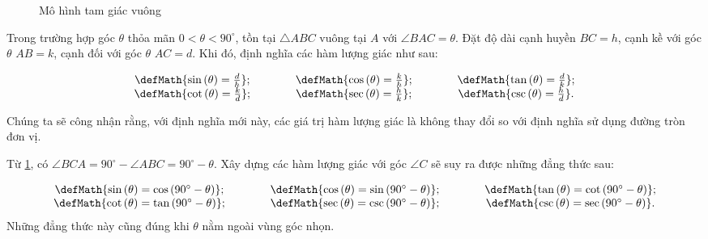 {\begin{minipageindent}{0.38\textwidth}
\begin{figure}[H]
         \caption{Mô hình tam giác vuông}
         \label{fig:toan_hoc_nen_tang:ham_luong_giac:tam_giac_vuong}
      \end{figure}
   \end{minipageindent}
   \hfill
   \begin{minipageindent}{0.58\textwidth}
      Trong trường hợp góc $\theta$ thỏa mãn $0 < \theta < 90^\circ$, tồn tại $\triangle ABC$ vuông tại $A$ với $\angle BAC = \theta$. Đặt độ dài cạnh huyền $BC = h$, cạnh kề với góc $\theta$ $AB = k$, cạnh đối với góc $\theta$ $AC = d$. Khi đó, định nghĩa các hàm lượng giác như sau:

      $$
         \begin{array}{ccccc}
            \defMath{\sin \left(\theta\right) = \frac{d}{h}}; &\qquad& \defMath{\cos \left(\theta\right) = \frac{k}{h}}; &\qquad& \defMath{\tan \left(\theta\right) = \frac{d}{k}}; \\
            \defMath{\cot \left(\theta\right) = \frac{k}{d}}; &\qquad& \defMath{\sec \left(\theta\right) = \frac{h}{k}}; &\qquad& \defMath{\csc \left(\theta\right) = \frac{h}{d}}.
         \end{array}
      $$

      Chúng ta sẽ công nhận rằng, với định nghĩa mới này, các giá trị hàm lượng giác là không thay đổi so với định nghĩa sử dụng đường tròn đơn vị.
   \end{minipageindent}
}

Từ \ref{fig:toan_hoc_nen_tang:ham_luong_giac:tam_giac_vuong}, có $\angle BCA = 90^\circ - \angle ABC = 90^\circ - \theta$. Xây dựng các hàm lượng giác với góc $\angle C$ sẽ suy ra được những đẳng thức sau:

\begin{equation*}
   \begin{array}{ccccc}
      \defMath{\sin\left(\theta\right) = \cos\left(90^\circ - \theta\right)}; &\qquad& \defMath{\cos\left(\theta\right) = \sin\left(90^\circ - \theta\right)}; &\qquad& \defMath{\tan\left(\theta\right) = \cot\left(90^\circ - \theta\right)}; \\
      \defMath{\cot\left(\theta\right) = \tan\left(90^\circ - \theta\right)}; &\qquad& \defMath{\sec\left(\theta\right) = \csc\left(90^\circ - \theta\right)}; &\qquad& \defMath{\csc\left(\theta\right) = \sec\left(90^\circ - \theta\right)}.
   \end{array}
\end{equation*}
Những đẳng thức này cũng đúng khi $\theta$ nằm ngoài vùng góc nhọn.